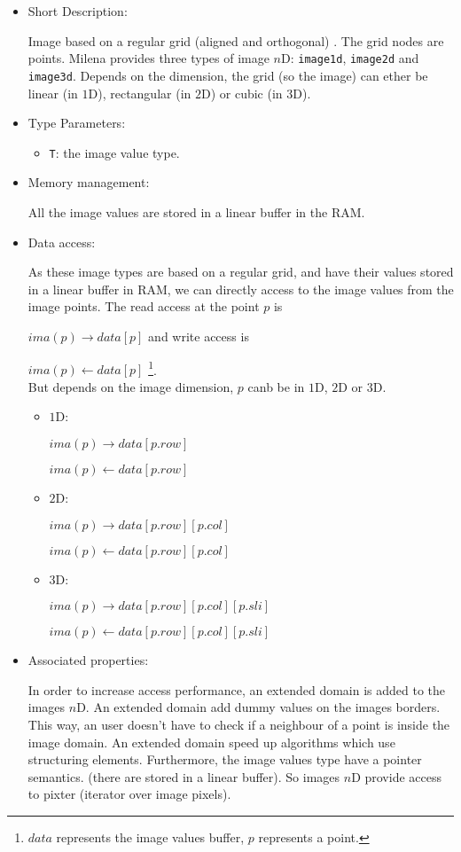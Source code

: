 \begin{itemize}
\item{Short Description:}

Image based on a regular grid (aligned and orthogonal) .
The grid nodes are points.
Milena provides three types of image $n$D: \verb+image1d+, \verb+image2d+ and
\verb+image3d+.
Depends on the dimension, the grid (so the image) can ether be linear
(in $1$D), rectangular (in $2$D) or cubic (in $3$D).

\item{Type Parameters:}

\begin{itemize}
\item \verb+T+: the image value type.
\end{itemize}


\item{Memory management:}

All the image values are stored in a linear buffer in the RAM.

\item{Data access:}

 As these image types are based on a regular grid, and have their values
stored in a linear buffer in RAM, we can directly access to the image
values from the image points.
The read access at the point $p$ is

$ima(p) \rightarrow data[p]$ and write access is

$ima(p) \leftarrow data[p]$ \footnote{$data$ represents the image
values buffer, $p$ represents a point.}.\\


But depends on the image dimension, $p$ canb be in $1$D, $2$D or $3$D.


\begin{itemize}
\item {$1$D:}

$ima(p) \rightarrow data[p.row]$

$ima(p) \leftarrow data[p.row]$
\item {$2$D:}

$ima(p) \rightarrow data[p.row][p.col]$

$ima(p) \leftarrow data[p.row][p.col]$
\item {$3$D:}

$ima(p) \rightarrow data[p.row][p.col][p.sli]$

$ima(p) \leftarrow data[p.row][p.col][p.sli]$
\end{itemize}


\item{Associated properties:}

In order to increase access performance, an extended domain is added to the
images $n$D.
An extended domain add dummy values on the images borders.
This way, an user doesn't have to check if a neighbour of a point is inside the
image domain.
An extended domain speed up algorithms which use structuring elements.
Furthermore, the image values type have a pointer semantics.
(there are stored in a linear buffer).
So images $n$D provide access to pixter (iterator over image pixels).

\end{itemize}


